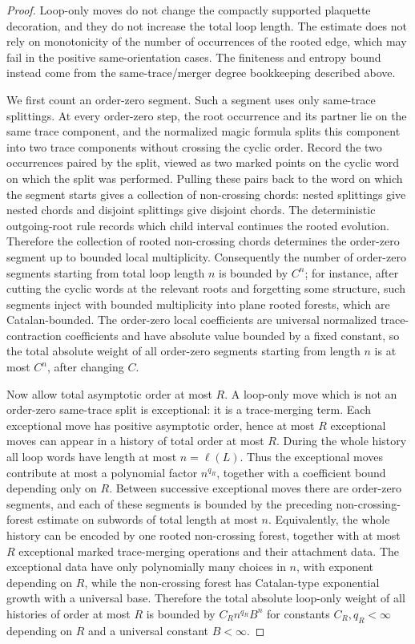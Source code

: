\documentclass[11pt,a4paper,reqno]{amsart}
\theoremstyle{definition}
\theoremstyle{remark}
\begin{document}
\begin{proof}
Loop-only moves do not change the compactly supported plaquette decoration, and they do not increase the total loop length. The estimate does not rely on monotonicity of the number of occurrences of the rooted edge, which may fail in the positive same-orientation cases. The finiteness and entropy bound instead come from the same-trace/merger degree bookkeeping described above.

We first count an order-zero segment.  Such a segment uses only same-trace splittings.  At every order-zero step, the root occurrence and its partner lie on the same trace component, and the normalized magic formula splits this component into two trace components without crossing the cyclic order.  Record the two occurrences paired by the split, viewed as two marked points on the cyclic word on which the split was performed.  Pulling these pairs back to the word on which the segment starts gives a collection of non-crossing chords: nested splittings give nested chords and disjoint splittings give disjoint chords.  The deterministic outgoing-root rule records which child interval continues the rooted evolution.  Therefore the collection of rooted non-crossing chords determines the order-zero segment up to bounded local multiplicity.  Consequently the number of order-zero segments starting from total loop length $n$ is bounded by $C^n$; for instance, after cutting the cyclic words at the relevant roots and forgetting some structure, such segments inject with bounded multiplicity into plane rooted forests, which are Catalan-bounded.  The order-zero local coefficients are universal normalized trace-contraction coefficients and have absolute value bounded by a fixed constant, so the total absolute weight of all order-zero segments starting from length $n$ is at most $C^n$, after changing $C$.

Now allow total asymptotic order at most $R$.  A loop-only move which is not an order-zero same-trace split is exceptional: it is a trace-merging term.  Each exceptional move has positive asymptotic order, hence at most $R$ exceptional moves can appear in a history of total order at most $R$.  During the whole history all loop words have length at most $n=\ell(L)$.  Thus the exceptional moves contribute at most a polynomial factor $n^{q_R}$, together with a coefficient bound depending only on $R$.  Between successive exceptional moves there are order-zero segments, and each of these segments is bounded by the preceding non-crossing-forest estimate on subwords of total length at most $n$.  Equivalently, the whole history can be encoded by one rooted non-crossing forest, together with at most $R$ exceptional marked trace-merging operations and their attachment data.  The exceptional data have only polynomially many choices in $n$, with exponent depending on $R$, while the non-crossing forest has Catalan-type exponential growth with a universal base.  Therefore the total absolute loop-only weight of all histories of order at most $R$ is bounded by $C_R n^{q_R}B^n$ for constants $C_R,q_R<\infty$ depending on $R$ and a universal constant $B<\infty$.


\end{proof}
\end{document}
